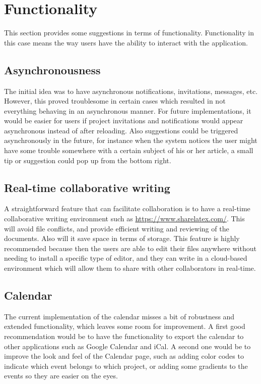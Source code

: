\section{Functionality}

This section provides some suggestions in terms of functionality. Functionality in this case means the way users have the ability to interact with the application.

\subsection{Asynchronousness}
The initial idea was to have asynchronous notifications, invitations, messages, etc. However, this proved troublesome in certain cases which resulted in not everything behaving in an asynchronous manner. For future implementations, it would be easier for users if project invitations and notifications would appear asynchronous instead of after reloading. Also suggestions could be triggered asynchronously in the future, for instance when the system notices the user might have some trouble somewhere with a certain subject of his or her article, a small tip or suggestion could pop up from the bottom right.

\subsection{Real-time collaborative writing } %
A straightforward feature that can facilitate collaboration is to have a real-time collaborative writing environment such as \url{https://www.sharelatex.com/}. This will avoid file conflicts, and provide efficient writing and reviewing of the documents. Also will it save space in terms of storage. This feature is highly recommended because then the users are able to edit their files anywhere without needing to install a specific type of editor, and they can write in a cloud-based environment which will allow them to share with other collaborators in real-time. 


\subsection{Calendar}
The current implementation of the calendar misses a bit of robustness and extended functionality, which leaves some room for improvement. A first good recommendation would be to have the functionality to export the calendar to other applications such as Google Calendar and iCal. A second one would be to improve the look and feel of the Calendar page, such as adding color codes to indicate which event belongs to which project, or adding some gradients to the events so they are easier on the eyes.

